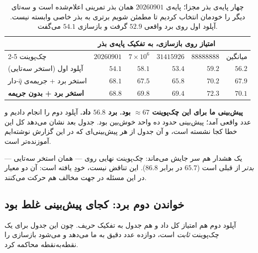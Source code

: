\documentclass[12pt,a4paper]{article}
\begin{document}
\begin{table}[h]\centering\small
\begin{tabular}{lrrrrr}
\toprule
 & \multicolumn{4}{c}{امتیاز روی بازسازی، به تفکیک پایه‌ی بذر} & \\
\cmidrule(lr){2-5}
چک‌پوینت & $20260901$ & $7\!\times\!10^6$ & $31415926$ & $88888888$ & میانگین\\
\midrule
آپلود اول (استخر سه‌تایی) & $54.1$ & $58.1$ & $53.4$ & $59.2$ & $56.2$\\
استخر برد + جریمه‌ی $\hat q$-دار & $68.1$ & $67.5$ & $65.8$ & $70.2$ & $67.9$\\
\textbf{استخر برد + بدون جریمه} & $\mathbf{68.8}$ & $\mathbf{69.8}$ & $\mathbf{69.4}$ & $\mathbf{72.3}$ & $\mathbf{70.1}$\\
\bottomrule
\end{tabular}
\caption{چهار پایه‌ی بذر مجزا؛ پایه‌ی $20260901$ همان بذر تمرینی
اعلام‌شده است و سه‌تای دیگر را خودمان انتخاب کردیم تا مطمئن شویم برتری
به بذر خاصی وابسته نیست. آپلود اول روی برد واقعی $52.9$ گرفت و بازسازی
$54.1$ می‌گفت.}
\end{table}

\begin{answer}
\textbf{پیش‌بینی ما برای این چک‌پوینت $\approx67$ بود. برد $56.8$ داد.}
آپلود دوم را انجام دادیم و عدد واقعی آمد؛ پیش‌بینی حدود ده واحد خوش‌بین
بود. جدول بعد نشان می‌دهد کل این خطا کجا نشسته است، و آن جدول از هر
پیش‌بینی‌ای که در این گزارش نوشته‌ایم آموزنده‌تر است.

یک هشدار هم سر جایش می‌ماند: چک‌پوینت نهایی روی 
— همان استخر سه‌تایی — \emph{بدتر} از قبلی است ($65.7$ در برابر $86.8$).
این تناقض نیست، خودِ یافته است: آن دو معیار در این مسئله در جهت مخالف هم
حرکت می‌کنند.
\end{answer}

\subsection{خواندن دوم برد: کجای پیش‌بینی غلط بود}
\label{sec:board2}

آپلود دوم هم امتیاز کل داد و هم جدول به تفکیک حریف. چون این جدول برای یک
چک‌پوینت \emph{ثابت} است، دوازده عدد دقیق به ما می‌دهد و می‌شود بازسازی
را نقطه‌به‌نقطه محاکمه کرد.
\end{document}
